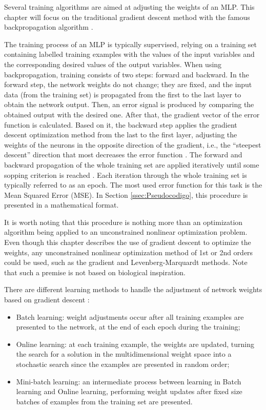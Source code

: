 Several training algorithms are aimed at adjusting the weights of an MLP. This chapter will focus on the traditional gradient descent method with the famous backpropagation algorithm \cite{rumelhart1986learning}.

The training process of an MLP is typically supervised, relying on a training set containing labelled training examples with the values of the input variables and the corresponding desired values of the output variables. When using backpropagation, training consists of two steps: forward and backward. In the forward step, the network weights do not change; they are fixed, and the input data (from the training set) is propagated from the first to the last layer to obtain the network output. Then, an error signal is produced by comparing the obtained output with the desired one. After that, the gradient vector of the error function is calculated. Based on it, the backward step applies the gradient descent optimization method from the last to the first layer, adjusting the weights of the neurons in the opposite direction of the gradient, i.e., the ``steepest descent'' direction that most decreases the error function \cite{haykin}. The forward and backward propagation of the whole training set are applied iteratively until some sopping criterion is reached \cite{Castro2006FundamentalsON}. Each iteration through the whole training set is typically referred to as an epoch. The most used error function for this task is the Mean Squared Error (MSE).  In Section \ref{ssec:Pseudocodigo}, this procedure is presented in a mathematical format. 

It is worth noting that this procedure is nothing more than an optimization algorithm being applied to an unconstrained nonlinear optimization problem. Even though this chapter describes the use of gradient descent to optimize the weights, any unconstrained nonlinear optimization method of 1st or 2nd orders could be used, such as the gradient and Levenberg-Marquardt methods. Note that such a premise is not based on biological inspiration.

There are different learning methods to handle the adjustment of network weights based on gradient descent \cite{haykin, Bengio2012}:

\begin{itemize}
	\item Batch learning: weight adjustments occur after all training examples are presented to the network, at the end of each epoch during the training;
	\item Online learning: at each training example, the weights are updated, turning the search for a solution in the multidimensional weight space into a stochastic search since the examples are presented in random order;
	\item Mini-batch learning: an intermediate process between learning in Batch learning and Online learning, performing weight updates after fixed size batches of examples from the training set are presented.
\end{itemize}



